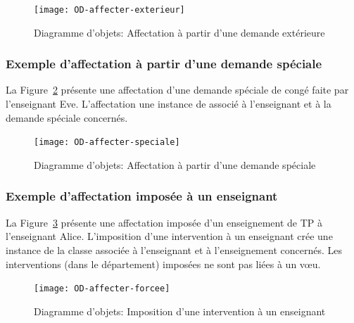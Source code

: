 \begin{ocl}
\begin{figure}[!htbp]
\begin{center}
\texttt{[image: OD-affecter-exterieur]}
\caption{Diagramme d'objets: Affectation à partir d'une demande extérieure}
\label{fig:affectation:ext}
\end{center}
\end{figure}


\subsubsection{Exemple d'affectation à partir d'une demande spéciale}
La Figure~\ref{fig:affectation:spe} présente une affectation d'une demande spéciale de congé faite par l'enseignant Eve.
L'affectation une instance de   associé à l'enseignant et à la demande spéciale concernés.

 \begin{figure}[!htbp]
 \begin{center}
 \texttt{[image: OD-affecter-speciale]}
 \caption{Diagramme d'objets: Affectation à partir d'une demande spéciale}
 \label{fig:affectation:spe}
 \end{center}
 \end{figure}

\subsubsection{Exemple d'affectation imposée à un enseignant}
La Figure~\ref{fig:affectation:imposee} présente une affectation imposée d'un enseignement de TP à l'enseignant Alice.
L'imposition d'une intervention à un enseignant crée une instance de la classe  associée à l'enseignant et à l'enseignement concernés. Les interventions (dans le département) imposées ne sont pas liées à un vœu.

\begin{figure}[!htbp]
\begin{center}
\texttt{[image: OD-affecter-forcee]}
\caption{Diagramme d'objets: Imposition d'une intervention à un enseignant}
\label{fig:affectation:imposee}
\end{center}
\end{figure}

\end{ocl}
